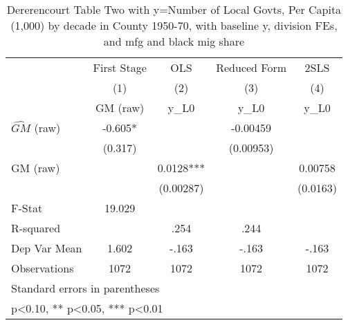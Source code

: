 \begin{table}[htbp]\centering
\def\sym#1{\ifmmode^{#1}\else\(^{#1}\)\fi}
\caption{Dererencourt Table Two with y=Number of Local Govts, Per Capita (1,000) by decade in County 1950-70, with baseline y, division FEs, and mfg and black mig share}
\begin{tabular}{l*{4}{c}}
\toprule
                    & First Stage   &         OLS   &Reduced Form   &        2SLS   \\
                    &\multicolumn{1}{c}{(1)}&\multicolumn{1}{c}{(2)}&\multicolumn{1}{c}{(3)}&\multicolumn{1}{c}{(4)}\\
                    &\multicolumn{1}{c}{GM  (raw)}&\multicolumn{1}{c}{y\_L0}&\multicolumn{1}{c}{y\_L0}&\multicolumn{1}{c}{y\_L0}\\
\midrule
$\hat{GM}$ (raw)    &      -0.605*  &               &    -0.00459   &               \\
                    &     (0.317)   &               &   (0.00953)   &               \\
\addlinespace
GM  (raw)           &               &      0.0128***&               &     0.00758   \\
                    &               &   (0.00287)   &               &    (0.0163)   \\
\midrule
F-Stat              &      19.029   &               &               &               \\
R-squared           &               &        .254   &        .244   &               \\
Dep Var Mean        &       1.602   &       -.163   &       -.163   &       -.163   \\
Observations        &        1072   &        1072   &        1072   &        1072   \\
\bottomrule
\multicolumn{5}{l}{\footnotesize Standard errors in parentheses}\\
\multicolumn{5}{l}{\footnotesize * p<0.10, ** p<0.05, *** p<0.01}\\
\end{tabular}
\end{table}

